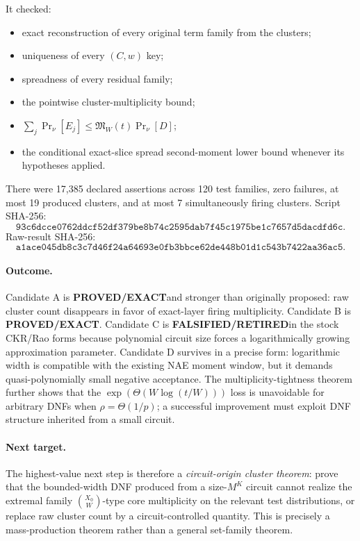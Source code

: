 \documentclass[11pt]{article}
\newcommand{\EXACT}{\textbf{PROVED/EXACT}}
\newcommand{\RET}{\textbf{FALSIFIED/RETIRED}}
\begin{document}
It checked:
\begin{itemize}
\item exact reconstruction of every original term family from the clusters;
\item uniqueness of every $(C,w)$ key;
\item spreadness of every residual family;
\item the pointwise cluster-multiplicity bound;
\item $\sum_j\Pr_\nu[E_j]\le\mathfrak M_W(t)\Pr_\nu[D]$;
\item the conditional exact-slice spread second-moment lower bound whenever its hypotheses applied.
\end{itemize}

There were 17,385 declared assertions across 120 test families, zero failures, at most 19 produced clusters, and at most 7 simultaneously firing clusters. Script SHA-256:
\[
\texttt{93c6dcce0762ddcf52df379be8b74c2595dab7f45c1975be1c7657d5dacdfd6c}.
\]
Raw-result SHA-256:
\[
\texttt{a1ace045db8c3c7d46f24a64693e0fb3bbce62de448b01d1c543b7422aa36ac5}.
\]

\paragraph{Outcome.}
Candidate A is \EXACT and stronger than originally proposed: raw cluster count disappears in favor of exact-layer firing multiplicity. Candidate B is \EXACT. Candidate C is \RET in the stock CKR/Rao forms because polynomial circuit size forces a logarithmically growing approximation parameter. Candidate D survives in a precise form: logarithmic width is compatible with the existing NAE moment window, but it demands quasi-polynomially small negative acceptance. The multiplicity-tightness theorem further shows that the $\exp(\Theta(W\log(t/W)))$ loss is unavoidable for arbitrary DNFs when $\rho=\Theta(1/p)$; a successful improvement must exploit DNF structure inherited from a small circuit.

\paragraph{Next target.}
The highest-value next step is therefore a \emph{circuit-origin cluster theorem}: prove that the bounded-width DNF produced from a size-$M^K$ circuit cannot realize the extremal family $\binom{X_0}{W}$-type core multiplicity on the relevant test distributions, or replace raw cluster count by a circuit-controlled quantity. This is precisely a mass-production theorem rather than a general set-family theorem.
\end{document}

